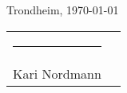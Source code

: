 \documentclass[pdftex, 10pt, norsk, a4paper, twoside]{article}
\numberwithin{equation}{section}
\numberwithin{figure}{section}
\numberwithin{table}{section}
\newcommand{\signature}[2]{
\begin{minipage}[t]{0.9\textwidth}
\vspace{1cm}

    #1, \today
\vspace{1.5cm}

\noindent
\begin{tabular}{cc}
    \rule{6cm}{1pt} & \hspace{2cm} \\
    #2 & 
\end{tabular}
\vspace{1cm}
\end{minipage}
}
\begin{document}

\vfill %
\signature{Trondheim}{Kari Nordmann} %

\newpage 

\end{document}
